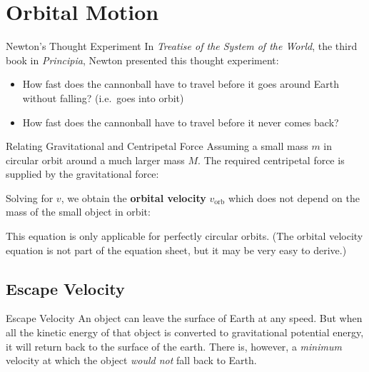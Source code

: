 \documentclass[12pt,compress,aspectratio=169]{beamer}
\begin{document}
\section{Orbital Motion}

\begin{frame}{Newton's Thought Experiment}
  In \emph{Treatise of the System of the World}, the third book in
  \emph{Principia}, Newton presented this thought experiment:
  \begin{center}
  \end{center}
  \begin{itemize}
  \item How fast does the cannonball have to travel before it goes around Earth
    without falling? (i.e.\ goes into orbit)
  \item How fast does the cannonball have to travel before it never comes back?
  \end{itemize}
\end{frame}



\begin{frame}{Relating Gravitational and Centripetal Force}
  Assuming a small mass $m$ in circular orbit around a much larger mass $M$.
  The required centripetal force is supplied by the gravitational force:
  

  \vspace{-.1in}Solving for $v$, we obtain the \textbf{orbital velocity}
  $v_{\text{orb}}$ which does not depend on the mass of the small object in
  orbit:


  This equation is only applicable for perfectly circular orbits.
  (The orbital velocity equation is not part of the equation sheet, but it may
  be very easy to derive.)
\end{frame}



\subsection{Escape Velocity}

\begin{frame}{Escape Velocity}
  An object can leave the surface of Earth at any speed. But when all the
  kinetic energy of that object is converted to gravitational potential energy,
  it will return back to the surface of the earth. There is, however, a
  \emph{minimum} velocity at which the object \emph{would not} fall back to
  Earth.
\end{frame}
\end{document}
